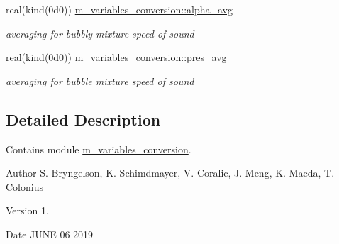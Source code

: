 \begin{Indent}
\begin{DoxyCompactItemize}
real(kind(0d0)) \hyperlink{namespacem__variables__conversion_ac41b66d567256cb60746f95010a6ea65}{m\+\_\+variables\+\_\+conversion\+::alpha\+\_\+avg}
\begin{DoxyCompactList}\small\item\em averaging for bubbly mixture speed of sound \end{DoxyCompactList}\item 
real(kind(0d0)) \hyperlink{namespacem__variables__conversion_a45f7e4963c2a7c792bad6a90bbe43c36}{m\+\_\+variables\+\_\+conversion\+::pres\+\_\+avg}
\begin{DoxyCompactList}\small\item\em averaging for bubble mixture speed of sound \end{DoxyCompactList}\end{DoxyCompactItemize}
\end{Indent}


\subsection{Detailed Description}
Contains module \hyperlink{namespacem__variables__conversion}{m\+\_\+variables\+\_\+conversion}. 

\begin{DoxyAuthor}{Author}
S. Bryngelson, K. Schimdmayer, V. Coralic, J. Meng, K. Maeda, T. Colonius 
\end{DoxyAuthor}
\begin{DoxyVersion}{Version}
1. 
\end{DoxyVersion}
\begin{DoxyDate}{Date}
J\+U\+NE 06 2019 
\end{DoxyDate}
